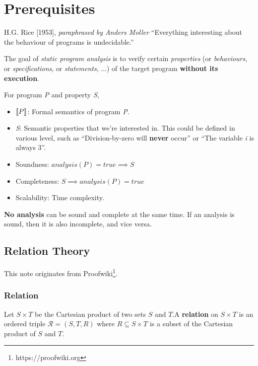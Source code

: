 \chapter{Prerequisites}
\begin{chapquote}{H.G. Rice [1953], \textit{paraphrased by Anders Moller}}
  ``Everything interesting about the behaviour of programs is
  undecidable.''
\end{chapquote}

The goal of \textit{static program analysis} is to verify certain
\textsl{properties} (or \textsl{behaviours}, or
\textsl{specifications}, or \textsl{statements}, ...) of the target
program \textbf{without its execution}.

For program \textsl{P} and property \textsl{S},

\begin{itemize}
\item $ \llbracket P \rrbracket $: Formal semantics of program \textsl{P}.

\item \textsl{S}: Semantic properties that we're interested in. This
  could be defined in various level, such as ``Division-by-zero will
  \textbf{never} occur'' or ``The variable \textit{i} is always 3''.

\item Soundness: $ analysis(P) = true \implies S $

\item Completeness: $ S \implies analysis(P) = true $

\item Scalability: Time complexity.
\end{itemize}


\textbf{No analysis} can be sound and complete at the same time. If an
analysis is sound, then it is also incomplete, and vice versa.

\newpage
\section{Relation Theory}
This note originates from
Proofwiki\footnote{https://proofwiki.org}.

\subsection{Relation}

Let $S \times T$ be the Cartesian product of two sets $S$ and $T$.A
\textbf{relation} on $S \times T$ is an ordered triple
$ \mathcal{R} = (S, T, R) $ where $R \subseteq S \times T$ is a subset
of the Cartesian product of $S$ and $T$.

